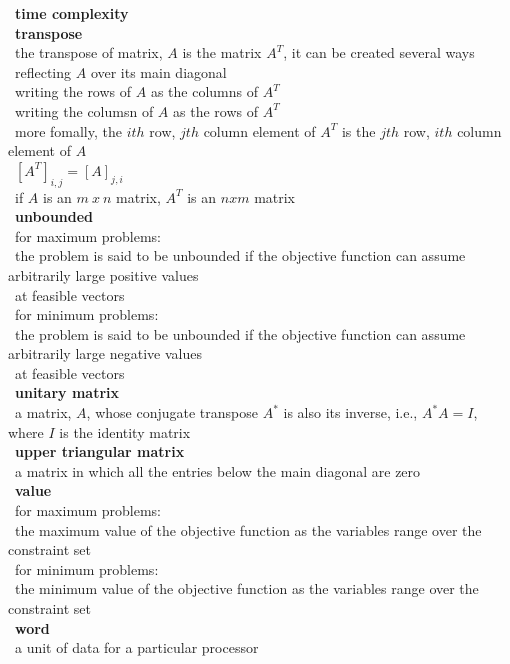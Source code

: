 \documentclass[10pt,letterpaper]{scrartcl}
\newcommand{\tbul}{\textbullet}
\newcommand{\tend}{\>\textendash}
\newcommand{\tasc}{\>\>\textasteriskcentered}
\newcommand{\tpec}{\>\>\>\textperiodcentered}
\begin{document}
\begin{tabbing}
\tbul\ \textbf{time complexity} \\
\tbul\ \textbf{transpose} \\
    \tend\ the transpose of matrix, $A$ is the matrix $A^T$, it can be created several ways \\
        \tasc\ reflecting $A$ over its main diagonal \\
        \tasc\ writing the rows of $A$ as the columns of $A^T$ \\
        \tasc\ writing the columsn of $A$ as the rows of $A^T$ \\
        \tasc\ more fomally, the $ith$ row, $jth$ column element of $A^T$ is the $jth$ row, $ith$ column element of $A$ \\
            \tpec\ $[A^T]_{i,j} = [A]_{j,i}$ \\
        \tasc\ if $A$ is an $m\ x\ n$ matrix, $A^T$ is an $nxm$ matrix \\
\tbul\ \textbf{unbounded} \\
    \tend\ for maximum problems: \\
        \tasc\ the problem is said to be unbounded if the objective function can assume arbitrarily large positive values \\ \>\>\ at feasible vectors \\
    \tend\ for minimum problems: \\
        \tasc\ the problem is said to be unbounded if the objective function can assume arbitrarily large negative values \\ \>\>\ at feasible vectors \\
\tbul\ \textbf{unitary matrix} \\
    \tend\ a matrix, $A$, whose conjugate transpose $A^*$ is also its inverse, i.e., $A^*A=I$, where $I$ is the identity matrix \\
\tbul\ \textbf{upper triangular matrix} \\
    \tend\ a matrix in which all the entries below the main diagonal are zero \\
\tbul\ \textbf{value} \\
    \tend\ for maximum problems: \\ 
        \tasc\ the maximum value of the objective function as the variables range over the constraint set \\
    \tend\ for minimum problems: \\
        \tasc\ the minimum value of the objective function as the variables range over the constraint set \\
\tbul\ \textbf{word} \\
    \tend\ a unit of data for a particular processor \\

\end{tabbing}
\end{document}
